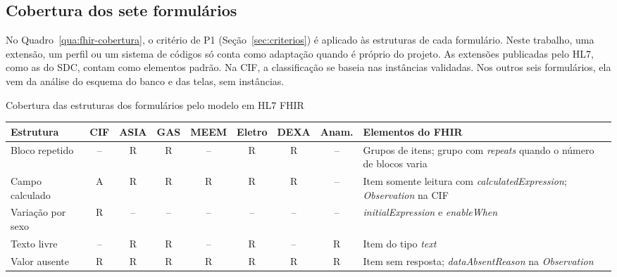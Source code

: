 \subsection{Cobertura dos sete formulários}
\label{sec:fhir-cobertura}

No Quadro~\ref{qua:fhir-cobertura}, o critério de P1 (Seção~\ref{sec:criterios}) é aplicado às estruturas de cada
formulário. Neste trabalho, uma extensão, um perfil ou um sistema de códigos só conta como adaptação quando é
próprio do projeto. As extensões publicadas pelo HL7, como as do SDC, contam como elementos padrão. Na CIF, a
classificação se baseia nas instâncias validadas. Nos outros seis formulários, ela vem da análise do esquema do
banco e das telas, sem instâncias.

\begin{quadro}[htb]
	\centering
	\caption{Cobertura das estruturas dos formulários pelo modelo em HL7 FHIR}
	\label{qua:fhir-cobertura}
	\footnotesize
	\begin{tabularx}{\textwidth}{|>{\raggedright\arraybackslash}p{}|c|c|c|c|c|c|c|>{\raggedright\arraybackslash}X|}
		\hline
		Estrutura & CIF & ASIA & GAS & MEEM & Eletro & DEXA & Anam. & Elementos do FHIR \\ \hline
		Bloco repetido & -- & R & R & -- & R & R & -- & Grupos de itens; grupo com \textit{repeats} quando o
			número de blocos varia \\ \hline
		Campo calculado & A & R & R & R & R & R & -- & Item somente leitura com \textit{calculatedExpression};
			\textit{Observation} na CIF \\ \hline
		Variação por sexo & R & -- & -- & -- & -- & -- & -- & \textit{initialExpression} e \textit{enableWhen} \\ \hline
		Texto livre & -- & R & R & -- & R & -- & R & Item do tipo \textit{text} \\ \hline
		Valor ausente & R & R & R & R & R & R & R & Item sem resposta; \textit{dataAbsentReason} na
			\textit{Observation} \\ \hline
	\end{tabularx}
\end{quadro}

